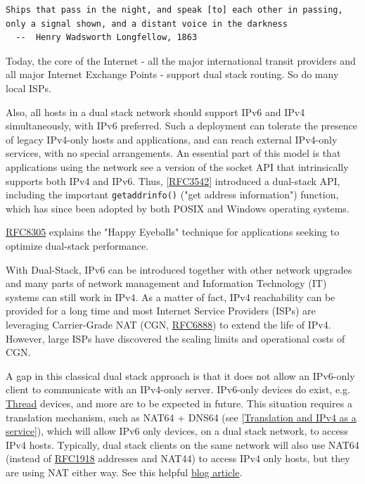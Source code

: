\documentclass[
]{article}
\begin{document}
\begin{verbatim}
Ships that pass in the night, and speak [to] each other in passing,
only a signal shown, and a distant voice in the darkness
  --  Henry Wadsworth Longfellow, 1863
\end{verbatim}

Today, the core of the Internet - all the major international transit
providers and all major Internet Exchange Points - support dual stack
routing. So do many local ISPs.

Also, all hosts in a dual stack network should support IPv6 and IPv4
simultaneously, with IPv6 preferred. Such a deployment can tolerate the
presence of legacy IPv4-only hosts and applications, and can reach
external IPv4-only services, with no special arrangements. An essential
part of this model is that applications using the network see a version
of the socket API that intrinsically supports both IPv4 and IPv6. Thus,
{[}\href{https://www.rfc-editor.org/info/rfc3542}{RFC3542}{]} introduced
a dual-stack API, including the important \texttt{getaddrinfo()} ("get
address information") function, which has since been adopted by both
POSIX and Windows operating systems.

\href{https://www.rfc-editor.org/info/rfc8305}{RFC8305} explains the
"Happy Eyeballs" technique for applications seeking to optimize
dual-stack performance.

With Dual-Stack, IPv6 can be introduced together with other network
upgrades and many parts of network management and Information Technology
(IT) systems can still work in IPv4. As a matter of fact, IPv4
reachability can be provided for a long time and most Internet Service
Providers (ISPs) are leveraging Carrier-Grade NAT (CGN,
\href{https://www.rfc-editor.org/info/rfc6888}{RFC6888}) to extend the
life of IPv4. However, large ISPs have discovered the scaling limits and
operational costs of CGN.

A gap in this classical dual stack approach is that it does not allow an
IPv6-only client to communicate with an IPv4-only server. IPv6-only
devices do exist, e.g.
\href{https://www.threadgroup.org/What-is-Thread/Overview}{Thread}
devices, and more are to be expected in future. This situation requires
a translation mechanism, such as NAT64 + DNS64 (see
{[}\hyperref[translation-and-ipv4-as-a-service]{Translation and IPv4 as
a service}{]}), which will allow IPv6 only devices, on a dual stack
network, to access IPv4 hosts. Typically, dual stack clients on the same
network will also use NAT64 (instead of
\href{https://www.rfc-editor.org/info/rfc1918}{RFC1918} addresses and
NAT44) to access IPv4 only hosts, but they are using NAT either way. See
this helpful
\href{https://sgryphon.gamertheory.net/2022/12/14/running-nat64-in-a-dual-stack-network/}{blog
article}.
\end{document}
